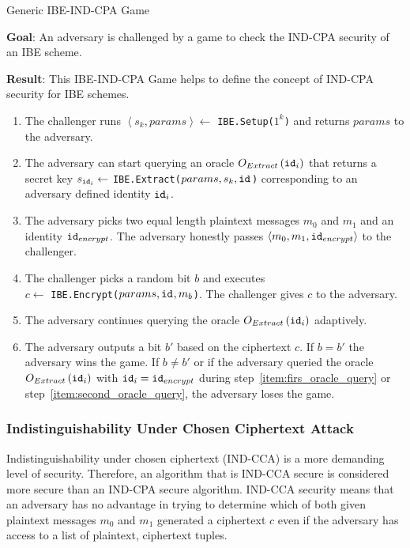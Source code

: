 \begin{algorithm}
\caption{Generic IBE-IND-CPA Game~\cite{thesis:Alfredo08}}
\label{alg:ind_cpa_game}
 \textbf{Goal}: An adversary is challenged by a game to check the IND-CPA security of an IBE scheme.
 
 \textbf{Result}: This IBE-IND-CPA Game helps to define the concept of IND-CPA security for IBE schemes.

 \begin{enumerate}
  \item The challenger runs $\left< s_k, params\right> \leftarrow$ \texttt{IBE.Setup($1^k$)} and returns $params$ to the adversary.
  \item \label{item:firs_oracle_query} The adversary can start querying an oracle $O_{Extract} \left( \mathtt{id}_{i} \right)$ that returns a secret key $s_{\mathtt{id}_{i}} \leftarrow$ \texttt{IBE.Extract($params, s_k, \mathtt{id}_{}$)} corresponding to an adversary defined identity $\mathtt{id}_{i}$.
  \item The adversary picks two equal length plaintext messages $m_0$ and $m_1$ and an identity $\mathtt{id}_{encrypt}$. The adversary honestly passes $\left< m_0, m_1, \mathtt{id}_{encrypt} \right>$ to the challenger.
  \item The challenger picks a random bit $b$ and executes \\ $c \leftarrow$ \texttt{IBE.Encrypt($params, \mathtt{id}_{}, m_b$)}. The challenger gives $c$ to the adversary.
  \item \label{item:second_oracle_query} The adversary continues querying the oracle $O_{Extract} \left( \mathtt{id}_{i} \right)$ adaptively.
  \item The adversary outputs a bit $b'$ based on the ciphertext $c$. If $b = b'$ the adversary wins the game. If $b \neq b'$ or if the adversary queried the oracle $O_{Extract} \left( \mathtt{id}_{i} \right)$ with $\mathtt{id}_{i} = \mathtt{id}_{encrypt}$ during step~\ref{item:firs_oracle_query} or step~\ref{item:second_oracle_query}, the adversary loses the game.
 \end{enumerate}
\end{algorithm}

\subsubsection{Indistinguishability Under Chosen Ciphertext Attack}
Indistinguishability under chosen ciphertext (IND-CCA) is a more demanding level of security. Therefore, an algorithm that is IND-CCA secure is considered more secure than an IND-CPA secure algorithm. IND-CCA security means that an adversary has no advantage in trying to determine which of both given plaintext messages $m_0$ and $m_1$ generated a ciphertext $c$ even if the adversary has access to a list of plaintext, ciphertext tuples.

